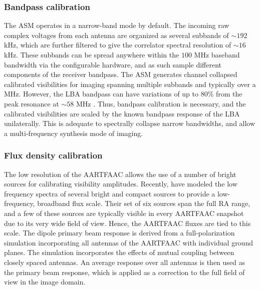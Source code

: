 \documentclass{aa}
\begin{document}

\subsubsection{Bandpass calibration}

The ASM  operates in a  narrow-band mode by  default.  The incoming  raw complex
voltages from each antenna are organized as several subbands of $\sim$$192$ kHz,
which  are  further filtered  to  give  the  correlator spectral  resolution  of
$\sim$$16$  kHz. These  subbands can  be spread  anywhere within  the  $100$ MHz
baseband bandwidth via  the configurable hardware, and as  such sample different
components  of  the receiver  bandpass.   The  ASM  generates channel  collapsed
calibrated  visibilities for  imaging spanning  multiple subbands  and typically
over a MHz. However, the LBA bandpass can have variations of up to 80\% from the
peak  resonance at  $\sim$$58$ MHz  \citep{vanhaarlem2013lofar}.  Thus, bandpass
calibration  is necessary,  and the  calibrated visibilities  are scaled  by the
known bandpass response of the  LBA unilaterally. This is adequate to spectrally
collapse  narrow  bandwidths, and  allow  a  multi-frequency  synthesis mode  of
imaging.


\subsubsection{Flux density calibration}

The low resolution of the AARTFAAC allows  the use of a number of bright sources
for calibrating  visibility amplitudes.  Recently,  \citet{scaife2012broad} have
modeled  the low  frequency spectra  of several  bright and  compact  sources to
provide a low-frequency, broadband flux scale. Their set of six sources span the
full  RA range,  and  a few  of these  sources  are typically  visible in  every
AARTFAAC  snapshot due  to its  very wide  field of  view.  Hence,  the AARTFAAC
fluxes are tied to this scale.  The dipole primary beam response is derived from
a full-polarization  simulation incorporating all antennas of  the AARTFAAC with
individual  ground planes.  The  simulation incorporates  the effects  of mutual
coupling between closely spaced antennas.  An average response over all antennas
is then used as  the primary beam response, which is applied  as a correction to
the full field of view in the image domain.
\end{document}
